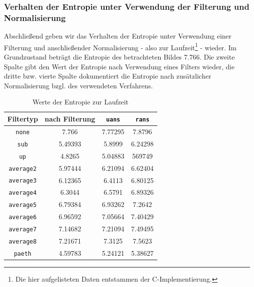 \documentclass[a4paper,12pt]{article}
\newcommand{\CC}{C\nolinebreak\hspace{-.05em}\raisebox{.4ex}{\tiny\bf+}\nolinebreak\hspace{-.10em}\raisebox{.4ex}{\tiny\bf+}\;}
\begin{document}
\newpage
\subsubsection{Verhalten der Entropie unter Verwendung der Filterung und Normalisierung}
Abschließend geben wir das Verhalten der Entropie unter Verwendung einer Filterung und anschließender Normalisierung - also zur Laufzeit\footnote{Die hier aufgelisteten Daten entstammen der \CC -Implementierung. } - wieder. Im Grundzustand beträgt die Entropie des betrachteten Bildes 7.766.
 Die zweite Spalte gibt den Wert der Entropie nach Verwendung eines Filters wieder, die dritte bzw. vierte Spalte dokumentiert die Entropie nach zusätzlicher Normalisierung bzgl. des verwendeten Verfahrens.
\par
\vspace{1cm}
\begin{table}[h]
\begin{center}
\begin{tabular}{c | c | c | c}
Filtertyp & nach Filterung &  {\tt{uans}} & {\tt{rans}}
\\
\hline
{\tt{none}} & 7.766 & 7.77295 & 7.8796
\\
{\tt{sub}} & 5.49393 & 5.8999 & 6.24298
\\
{\tt{up}} & 4.8265 & 5.04883 & 569749 
\\
{\tt{average2}} & 5.97444 & 6.21094 & 6.62404
\\
{\tt{average3}} & 6.12365& 6.4113 & 6.80125
\\
{\tt{average4}} & 6.3044 & 6.5791 & 6.89326
\\
{\tt{average5}} & 6.79384 & 6.93262 & 7.2642
\\
{\tt{average6}} & 6.96592 & 7.05664 & 7.40429
\\
{\tt{average7}} & 7.14682 & 7.21094 & 7.49495
\\
{\tt{average8}}& 7.21671 & 7.3125 & 7.5623
\\
{\tt{paeth}} & 4.59783 & 5.24121 & 5.38627
\end{tabular}
\caption{Werte der Entropie zur Laufzeit}
\end{center}
\end{table}
\end{document}
